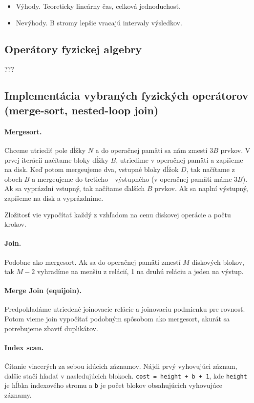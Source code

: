 \documentclass[10pt,a4paper]{article}
\begin{document}
\begin{itemize}
\item Výhody. Teoreticky lineárny čas, celková jednoduchosť.
\item Nevýhody. B stromy lepšie vracajú intervaly výsledkov.
\end{itemize}

\subsection{Operátory fyzickej algebry}
???


\subsection{Implementácia vybraných fyzických operátorov (merge-sort, nested-loop join)}

\paragraph{Mergesort.}
Chceme utriediť pole dĺžky $N$ a do operačnej pamäti sa nám zmestí $3B$ prvkov.
V prvej iterácii načítame bloky dĺžky $B$, utriedime v operačnej pamäti a zapíšeme na disk.
Keď potom mergeujeme dva, vstupné bloky dĺžok $D$, tak načítame z oboch $B$ a mergeujeme do tretieho - výstupného (v operačnej pamäti máme $3B$). Ak sa vyprázdni vstupný, tak načítame ďalších $B$ prvkov. Ak sa naplní výstupný, zapíšeme na disk a vyprázdnime.

Zložitosť vie vypočítať každý z vzhľadom na cenu diskovej operácie a počtu krokov.

\paragraph{Join.}
Podobne ako mergesort. Ak sa do operačnej pamäti zmestí $M$ diskových blokov,
tak $M-2$ vyhradíme na menšiu z relácií, 1 na druhú reláciu a jeden na výstup.

\paragraph{Merge Join (equijoin).}
Predpokladáme utriedené joinovacie relácie a joinovaciu podmienku pre rovnosť.
Potom vieme join vypočítať podobným spôsobom ako mergesort, akurát sa potrebujeme zbaviť duplikátov.

\paragraph{Index scan.}
Čítanie viacerých za sebou idúcich záznamov.
Nájdi prvý vyhovujúci záznam, ďalšie stačí hľadať v nasledujúcich blokoch.
\verb|cost = height + b + 1|, kde \verb|height| je hĺbka indexového stromu a
\verb|b| je počet blokov obsahujúcich vyhovujúce záznamy.
\end{document}
